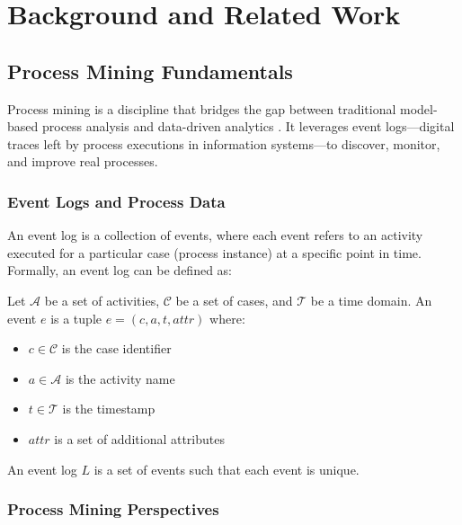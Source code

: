 
\chapter{Background and Related Work}
\label{ch:background}

\section{Process Mining Fundamentals}
\label{sec:process_mining_fundamentals}

Process mining is a discipline that bridges the gap between traditional model-based process analysis and data-driven analytics \cite{vanderaalst2016process}. It leverages event logs—digital traces left by process executions in information systems—to discover, monitor, and improve real processes.

\subsection{Event Logs and Process Data}
\label{subsec:event_logs}

An event log is a collection of events, where each event refers to an activity executed for a particular case (process instance) at a specific point in time. Formally, an event log can be defined as:

\begin{definition}
Let $\mathcal{A}$ be a set of activities, $\mathcal{C}$ be a set of cases, and $\mathcal{T}$ be a time domain. An event $e$ is a tuple $e = (c, a, t, attr)$ where:
\begin{itemize}
    \item $c \in \mathcal{C}$ is the case identifier
    \item $a \in \mathcal{A}$ is the activity name
    \item $t \in \mathcal{T}$ is the timestamp
    \item $attr$ is a set of additional attributes
\end{itemize}
An event log $L$ is a set of events such that each event is unique.
\end{definition}

\subsection{Process Mining Perspectives}
\label{subsec:pm_perspectives}

